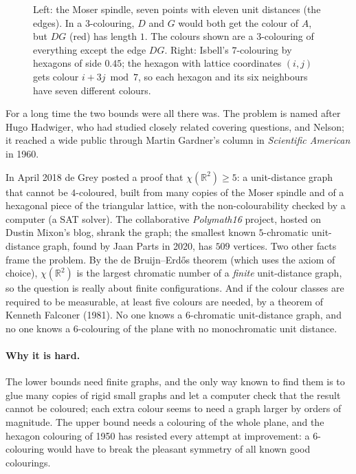\begin{figure}[ht]
\centering
{}
\caption{Left: the Moser spindle, seven points with eleven unit distances (the edges). In a $3$-colouring, $D$ and $G$ would both get the colour of $A$,
but $DG$ (red) has length $1$. The colours shown are a $3$-colouring of everything except the edge $DG$. Right: Isbell's $7$-colouring by hexagons of
side $0.45$; the hexagon with lattice coordinates $(i,j)$ gets colour $i+3j\bmod7$, so each hexagon and its six neighbours have seven different colours.}
\label{conjectures:fig:spindle}
\end{figure}

For a long time the two bounds were all there was. The problem is named after Hugo Hadwiger, who had studied closely related covering questions, and
Nelson; it reached a wide public through Martin Gardner's column in \emph{Scientific American} in 1960.

\begin{remark}\label{conjectures:rem:degrey}
In April 2018 de Grey posted a proof that $\chi(\mathbb R^2)\ge5$: a unit-distance graph that cannot be $4$-coloured, built from many copies of the Moser
spindle and of a hexagonal piece of the triangular lattice, with the non-colourability checked by a computer (a SAT solver). The collaborative
\emph{Polymath16} project, hosted on Dustin Mixon's blog, shrank the graph; the smallest known $5$-chromatic unit-distance
graph, found by Jaan Parts in 2020, has $509$ vertices. Two other facts frame the problem. By the de Bruijn--Erd\H os theorem (which uses the axiom of
choice), $\chi(\mathbb R^2)$ is the largest chromatic number of a \emph{finite} unit-distance graph, so the question is really about finite
configurations. And if the colour classes are required to be measurable, at least five colours are needed, by a theorem of Kenneth Falconer (1981). No
one knows a $6$-chromatic unit-distance graph, and no one knows a $6$-colouring of the plane with no monochromatic unit distance.
\end{remark}

\paragraph{Why it is hard.} The lower bounds need finite graphs, and the only way known to find them is to glue many copies of rigid small graphs and
let a computer check that the result cannot be coloured; each extra colour seems to need a graph larger by orders of magnitude. The upper bound needs a
colouring of the whole plane, and the hexagon colouring of 1950 has resisted every attempt at improvement: a $6$-colouring would have to break the
pleasant symmetry of all known good colourings.

